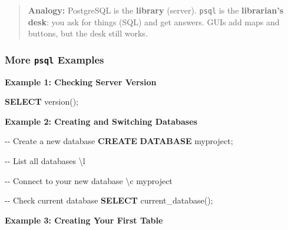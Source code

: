 \documentclass[
  letterpaper,
  DIV=11,
  numbers=noendperiod]{scrartcl}
\newenvironment{Shaded}{\begin{snugshade}}{\end{snugshade}}
\newcommand{\CommentTok}[1]{\textcolor[rgb]{0.37,0.37,0.37}{#1}}
\newcommand{\KeywordTok}[1]{\textcolor[rgb]{0.00,0.23,0.31}{\textbf{#1}}}
\newcommand{\NormalTok}[1]{\textcolor[rgb]{0.00,0.23,0.31}{#1}}
\begin{document}
\begin{quote}
\textbf{Analogy:} PostgreSQL is the \textbf{library} (server).
\texttt{psql} is the \textbf{librarian's desk}: you ask for things (SQL)
and get answers. GUIs add maps and buttons, but the desk still works.
\end{quote}

\subsubsection{\texorpdfstring{More \texttt{psql}
Examples}{More psql Examples}}\label{more-psql-examples}

\textbf{Example 1: Checking Server Version}

\begin{Shaded}
\begin{Highlighting}[]
\KeywordTok{SELECT}\NormalTok{ version();}
\end{Highlighting}
\end{Shaded}

\textbf{Example 2: Creating and Switching Databases}

\begin{Shaded}
\begin{Highlighting}[]
\CommentTok{{-}{-} Create a new database}
\KeywordTok{CREATE} \KeywordTok{DATABASE}\NormalTok{ myproject;}

\CommentTok{{-}{-} List all databases}
\NormalTok{\textbackslash{}l}

\CommentTok{{-}{-} Connect to your new database}
\NormalTok{\textbackslash{}c myproject}

\CommentTok{{-}{-} Check current database}
\KeywordTok{SELECT}\NormalTok{ current\_database();}
\end{Highlighting}
\end{Shaded}

\textbf{Example 3: Creating Your First Table}
\end{document}
